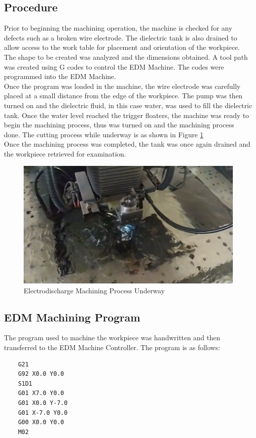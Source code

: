 \subsection{Procedure}
Prior to beginning the machining operation, the machine is checked for any defects such as a broken wire electrode. The dielectric tank is also drained to allow access to the work table for placement and orientation of the workpiece.\\
The shape to be created was analyzed and the dimensions obtained. A tool path was created using G codes to control the EDM Machine. The codes were programmed into the EDM Machine.\\
Once the program was loaded in the machine, the wire electrode was carefully placed at a small distance from the edge of the workpiece. The pump was then turned on and the dielectric fluid, in this case water, was used to fill the dielectric tank. Once the water level reached the trigger floaters, the machine was ready to begin the machining process, thus was turned on and the machining process done. The cutting process while underway is as shown in Figure \ref{fig:cutting}\\
Once the machining process was completed, the tank was once again drained and the workpiece retrieved for examination.
\begin{figure}[h!]
	\centering
	\includegraphics[width=0.7\linewidth]{Figures/edmmachining}
	\caption[EDM Machining Process]{Electrodischarge Machining Process Underway}
	\label{fig:cutting}
\end{figure}
\newpage
\subsection{EDM Machining Program}
The program used to machine the workpiece was  handwritten and then transferred to the EDM Machine Controller. The program is as follows:
\\
\begin{verbatim}
	G21
	G92 X0.0 Y0.0
	S1D1
	G01 X7.0 Y0.0
	G01 X0.0 Y-7.0
	G01 X-7.0 Y0.0
	G00 X0.0 Y0.0
	M02
\end{verbatim}